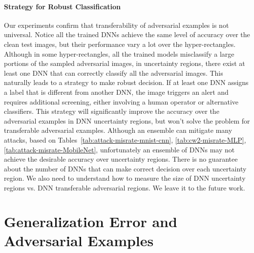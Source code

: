 \documentclass[12pt]{article}
\begin{document}
\paragraph{Strategy for Robust Classification} Our experiments
confirm that transferability of adversarial examples is not
universal. Notice all the trained DNNs achieve the same level of
accuracy over the clean test images, but their performance vary a lot
over the hyper-rectangles.  Although in some hyper-rectangles, all the
trained models misclassify a large portions of the sampled
adversarial images, in 
uncertainty regions, there exist at least one DNN that can correctly
classify all the adversarial images. This naturally leads to a
strategy to make robust decision. If at least one DNN assigns
a label that is different from another DNN, the image triggers
an alert and requires additional screening, either involving a human
operator or alternative classifiers. This strategy will significantly
improve the accuracy over the adversarial examples in DNN uncertainty
regions, but won't solve the problem for transferable adversarial
examples. Although an ensemble can mitigate many attacks, based on
Tables~\ref{tab:attack-misrate-mnist-cnn}, \ref{tab:cw2-misrate-MLP}, \ref{tab:attack-misrate-MobileNet},
unfortunately an ensemble of DNNs may not achieve the 
desirable accuracy over uncertainty regions. There is no
guarantee about the number of DNNs that can make correct
decision over each uncertainty region.
We also need to understand how to measure the size of DNN
uncertainty regions vs. DNN transferable adversarial regions. We leave
it to the future work.    

%
\section{Generalization Error and Adversarial Examples}
\label{sec:theory}
\end{document}
